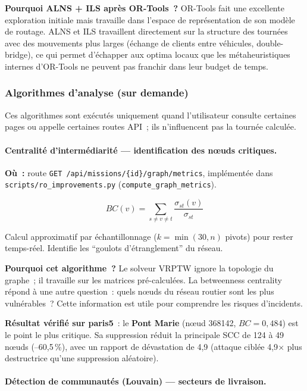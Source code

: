\documentclass[a4paper, 12pt, twoside]{article}
\begin{document}
\textbf{Pourquoi ALNS + ILS apr\`{e}s OR-Tools~?}
OR-Tools fait une excellente exploration initiale mais travaille dans l'espace de
repr\'{e}sentation de son mod\`{e}le de routage. ALNS et ILS travaillent directement
sur la structure des tourn\'{e}es avec des mouvements plus larges (\'{e}change de
clients entre v\'{e}hicules, double-bridge), ce qui permet d'\'{e}chapper aux optima
locaux que les m\'{e}taheuristiques internes d'OR-Tools ne peuvent pas franchir dans
leur budget de temps.

\subsubsection{Algorithmes d'analyse (sur demande)}

Ces algorithmes sont ex\'{e}cut\'{e}s uniquement quand l'utilisateur consulte certaines
pages ou appelle certaines routes API~; ils n'influencent pas la tourn\'{e}e calcul\'{e}e.

\paragraph{Centralit\'{e} d'interm\'{e}diarit\'{e} --- identification des n\oe uds critiques.}

\textbf{O\`{u}~:} route \texttt{GET /api/missions/\{id\}/graph/metrics},
impl\'{e}ment\'{e}e dans \texttt{scripts/ro\_improvements.py} (\texttt{compute\_graph\_metrics}).

\[
  BC(v) = \sum_{s \neq v \neq t} \frac{\sigma_{st}(v)}{\sigma_{st}}
\]

Calcul approximatif par \'{e}chantillonnage ($k = \min(30, n)$ pivots) pour rester
temps-r\'{e}el. Identifie les ``goulots d'\'{e}tranglement'' du r\'{e}seau.

\textbf{Pourquoi cet algorithme~?}
Le solveur VRPTW ignore la topologie du graphe~; il travaille sur les matrices pr\'{e}-calcul\'{e}es.
La betweenness centrality r\'{e}pond \`{a} une autre question~: quels n\oe uds du r\'{e}seau
routier sont les plus vuln\'{e}rables~? Cette information est utile pour comprendre
les risques d'incidents.

\textbf{R\'{e}sultat v\'{e}rifi\'{e} sur paris5}~: le \textbf{Pont Marie} (n\oe ud 368142,
$BC = 0{,}484$) est le point le plus critique. Sa suppression r\'{e}duit la principale
SCC de 124 \`{a} 49 n\oe uds (--60,5\,\%), avec un rapport de d\'{e}vastation de 4,9
(attaque cibl\'{e}e 4,9$\times$ plus destructrice qu'une suppression al\'{e}atoire).

\paragraph{D\'{e}tection de communaut\'{e}s (Louvain) --- secteurs de livraison.}
\end{document}
